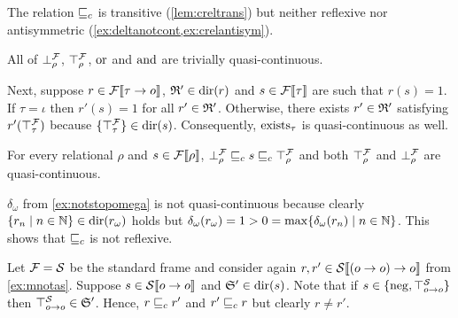 \documentclass[a4paper,twoside,notitlepage,openright,11pt]{report}
\begin{document}
The relation $\sqsubseteq_c$ is transitive (\cref{lem:creltrans}) but neither reflexive nor antisymmetric (\cref{ex:deltanotcont,ex:crelantisym}).
\begin{example}
  \begin{thmlist}
  \item\label{ex:qclog1} All of $\bot^\mathcal F_\rho$, $\top^\mathcal F_\rho$, $\operatorname{or}$ and $\operatorname{and}$ are trivially quasi-continuous.
  \item\label{ex:qclog2} Next, suppose $r\in{\mathcal F}\llbracket\tau\to o\rrbracket$, $\mathfrak R'\in\operatorname{dir}(r)$ and $s\in{\mathcal F}\llbracket\tau\rrbracket$ are such that $r(s)=1$. If $\tau=\iota$ then $r'(s)=1$ for all $r'\in\mathfrak R'$. Otherwise, there exists $r'\in\mathfrak R'$ satisfying $r'(\top_\tau^\mathcal F)$ because $\{\top^\mathcal F_\tau\}\in\operatorname{dir}(s)$. Consequently, $\operatorname{exists}_\tau$ is quasi-continuous as well.
  \item\label{ex:conttriv}
    For every relational $\rho$ and $s\in{\mathcal F}\llbracket\rho\rrbracket$, $\bot^\mathcal F_\rho\sqsubseteq_c s\sqsubseteq_c\top^\mathcal F_\rho$ and both $\top^\mathcal F_\rho$ and $\bot^\mathcal F_\rho$ are quasi-continuous.
  \item\label{ex:deltanotcont} $\delta_\omega$ from \cref{ex:notstopomega} is not quasi-continuous because clearly $\{r_n\mid n\in\mathbb N\}\in\operatorname{dir}(r_\omega)$ holds but $\delta_\omega(r_\omega)=1>0=\max\{\delta_\omega(r_n)\mid n\in\mathbb N\}$. This shows that $\sqsubseteq_c$ is not reflexive.
  \item\label{ex:crelantisym} Let $\mathcal F=\mathcal S$ be the standard frame and consider again  $r,r'\in{\mathcal S}\llbracket(o\to o)\to o\rrbracket$ from \cref{ex:mnotas}. Suppose $s\in{\mathcal S}\llbracket o\to o\rrbracket$ and $\mathfrak S'\in\operatorname{dir}(s)$. Note that if $s\in\{\operatorname{neg},\top_{o\to o}^\mathcal S\}$ then $\top_{o\to o}^\mathcal S\in\mathfrak S'$. Hence, $r\sqsubseteq_c r'$ and $r'\sqsubseteq_c r$ but clearly $r\neq r'$.
  \end{thmlist}
\end{example}
\end{document}
